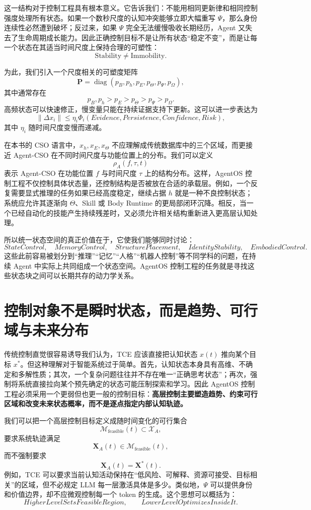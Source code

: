 这一结构对于控制工程具有根本意义。它告诉我们：不能用相同更新律和相同控制强度处理所有状态。如果一个数秒尺度的认知冲突能够立即大幅重写 $\Psi$，那么身份连续性必然遭到破坏；反过来，如果 $\Psi$ 完全无法缓慢吸收长期经历，Agent 又失去了生命周期成长能力。因此正确控制目标不是让所有状态“稳定不变”，而是让每一个状态在其适当时间尺度上保持合理的可塑性：
\[
\boxed{
\text{Stability}
\neq
\text{Immobility}.
}
\]

为此，我们引入一个尺度相关的可塑度矩阵
\[
\mathbf P
=
\operatorname{diag}
(
p_B,p_h,p_E,p_\Theta,p_\Psi,p_\Omega
),
\]
其中通常存在
\[
p_B,p_h
>
p_E
>
p_\Theta
>
p_\Psi
>
p_\Omega.
\]
高频状态可以快速修正，慢变量只能在持续证据支持下更新。这可以进一步表达为
\[
\|\Delta x_i\|
\le
\eta_i
\Phi_i(
Evidence,
Persistence,
Confidence,
Risk
),
\]
其中 $\eta_i$ 随时间尺度变慢而递减。

在本书的 CSO 语言中，$x_h,x_E,x_\Theta$ 不应理解成传统数据库中的三个区域，而更接近 Agent-CSO 在不同时间尺度与功能位置上的分布。我们可以定义
\[
\rho_A(f,\tau,t)
\]
表示 Agent-CSO 在功能位置 $f$ 与时间尺度 $\tau$ 上的结构分布。这样，AgentOS 控制工程不仅控制具体状态量，还控制结构是否被放在合适的承载层。例如，一个反复需要显式推理的任务如果已经高度稳定，继续占据 $h$ 就是一种不良控制状态；系统应允许其逐渐向 $\Theta$、Skill 或 Body Runtime 的更局部闭环沉降。相反，当一个已经自动化的技能产生持续残差时，又必须允许相关结构重新进入更高层认知处理。

所以统一状态空间的真正价值在于，它使我们能够同时讨论：
\[
\boxed{
StateControl,\quad
MemoryControl,\quad
StructurePlacement,\quad
IdentityStability,\quad
EmbodiedControl.
}
\]
这些此前容易被划分到“推理”“记忆”“人格”“机器人控制”等不同学科的问题，在持续 Agent 中实际上共同组成一个状态空间。AgentOS 控制工程的任务就是寻找这些状态块之间可以长期共存的动力学关系。

\section{控制对象不是瞬时状态，而是趋势、可行域与未来分布}

传统控制直觉很容易诱导我们认为，TCE 应该直接把认知状态 $x(t)$ 推向某个目标 $x^\ast$。但这种理解对于智能系统过于简单。首先，认知状态本身具有高维、不确定和多解性质；其次，一个复杂问题往往并不存在唯一“正确思考状态”；再次，强制将系统直接拉向某个预先确定的状态可能压制探索和学习。因此 AgentOS 控制工程必须采用一个更弱但也更一般的控制目标：\textbf{高层控制主要塑造趋势、约束可行区域和改变未来状态概率，而不是逐点指定内部认知轨迹。}

我们可以把一个高层控制目标定义成随时间变化的可行集合
\[
\mathcal M_{\mathrm{feasible}}(t)
\subset
\mathcal X_A,
\]
要求系统轨迹满足
\[
\mathbf X_A(t)\in
\mathcal M_{\mathrm{feasible}}(t),
\]
而不强制要求
\[
\mathbf X_A(t)=\mathbf X^\ast(t).
\]
例如，TCE 可以要求当前认知活动保持在“低风险、可解释、资源可接受、目标相关”的区域，但不必规定 LLM 每一层激活具体是多少。类似地，$\Psi$ 可以提供身份和价值边界，却不应微观控制每一个 token 的生成。这个思想可以概括为：
\[
\boxed{
HigherLevelSetsFeasibleRegion,\qquad
LowerLevelOptimizesInsideIt.
}
\]

